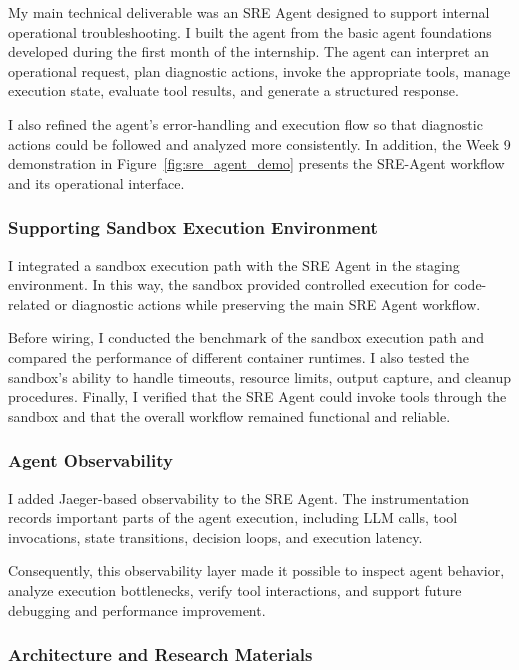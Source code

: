 \documentclass[a4paper]{article}
\theoremstyle{definition}
\begin{document}
My main technical deliverable was an SRE Agent designed to support internal operational troubleshooting. I built the agent from the basic agent foundations developed during the first month of the internship. The agent can interpret an operational request, plan diagnostic actions, invoke the appropriate tools, manage execution state, evaluate tool results, and generate a structured response.

I also refined the agent's error-handling and execution flow so that diagnostic actions could be followed and analyzed more consistently. In addition, the Week 9 demonstration in Figure~\ref{fig:sre_agent_demo} presents the SRE-Agent workflow and its operational interface.

\subsubsection{Supporting Sandbox Execution Environment}

I integrated a sandbox execution path with the SRE Agent in the staging environment. In this way, the sandbox provided controlled execution for code-related or diagnostic actions while preserving the main SRE Agent workflow.

Before wiring, I conducted the benchmark of the sandbox execution path and compared the performance of different container runtimes. I also tested the sandbox's ability to handle timeouts, resource limits, output capture, and cleanup procedures. Finally, I verified that the SRE Agent could invoke tools through the sandbox and that the overall workflow remained functional and reliable.

\subsubsection{Agent Observability}

I added Jaeger-based observability to the SRE Agent. The instrumentation records important parts of the agent execution, including LLM calls, tool invocations, state transitions, decision loops, and execution latency.

Consequently, this observability layer made it possible to inspect agent behavior, analyze execution bottlenecks, verify tool interactions, and support future debugging and performance improvement.

\subsubsection{Architecture and Research Materials}
\end{document}

